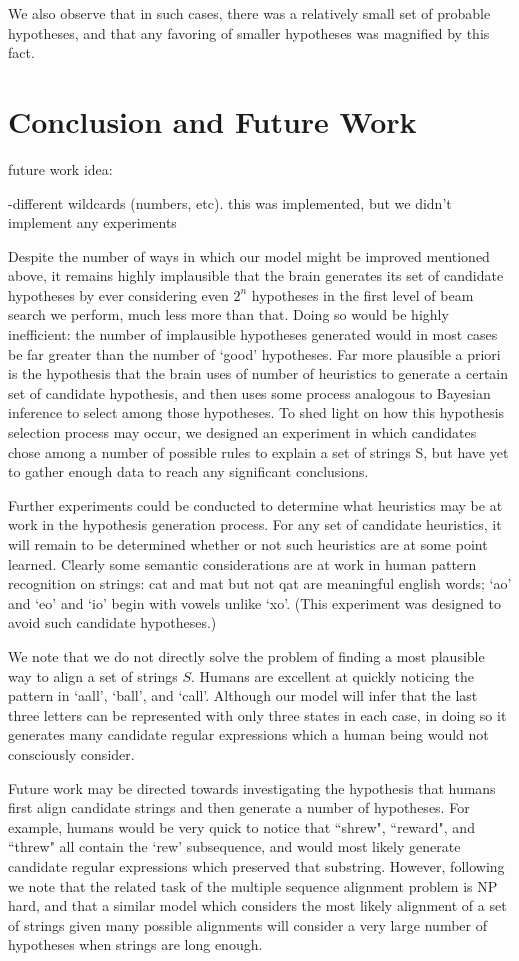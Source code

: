 \documentclass[10pt,letterpaper]{article}
\begin{document}
We also observe that in such cases, there was a relatively small set of probable hypotheses, and that any favoring of smaller hypotheses was magnified by this fact. 
\section{Conclusion and Future Work}
future work idea:

-different wildcards (numbers, etc). this was implemented, but we didn't implement any experiments

Despite the number of ways in which our model might be improved mentioned above,  it remains highly implausible that the brain generates its set of candidate hypotheses by ever considering even $2^n$ hypotheses in the first level of beam search we perform, much less more than that. Doing so would be highly inefficient: the number of implausible hypotheses generated would in most cases be far greater than the number of `good' hypotheses. Far more plausible a priori is the hypothesis that the brain uses of number of heuristics to generate a certain set of candidate hypothesis, and then uses some process analogous to Bayesian inference to select among those hypotheses. To shed light on how this hypothesis selection process may occur, we designed an experiment in which candidates chose among a number of possible rules to explain a set of strings S, but have yet to gather enough data to reach any significant conclusions. 

Further experiments could be conducted to determine what heuristics may be at work in the hypothesis generation process. For any set of candidate heuristics, it will remain to be determined whether or not such heuristics are at some point learned. Clearly some semantic considerations are at work in human pattern recognition on strings: cat and mat but not qat are meaningful english words; `ao' and `eo' and `io' begin with vowels unlike `xo'. (This experiment was designed to avoid such candidate hypotheses.)

We note that we do not directly solve the problem of finding a most plausible way to align a set of strings $S$. Humans are excellent at quickly noticing the pattern in `aall', `ball', and `call'. Although our model will infer that the last three letters can be represented with only three states in each case, in doing so it generates many candidate regular expressions which a human being would not consciously consider.  

Future work may be directed towards investigating the hypothesis that humans first align candidate strings and then generate a number of hypotheses. For example, humans would be very quick to notice that ``shrew", ``reward", and ``threw" all contain the `rew' subsequence, and would most likely generate candidate regular expressions which preserved that substring. However, following  we note that the related task of the multiple sequence alignment problem is NP hard, and that a similar model which considers the most likely alignment of a set of strings given many possible alignments will consider a very large number of hypotheses when strings are long enough.  
\end{document}
